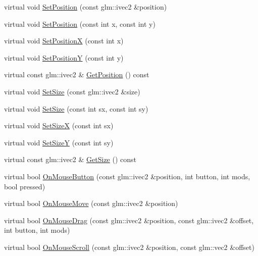 \begin{DoxyCompactItemize}
\item 
virtual void \mbox{\hyperlink{classec__gui_1_1_widget_a1d109a45aa25340f8e76e037e5309be1}{Set\+Position}} (const glm\+::ivec2 \&position)
\item 
virtual void \mbox{\hyperlink{classec__gui_1_1_widget_ac2af69d4d1b2f03310f036299c9df917}{Set\+Position}} (const int x, const int y)
\item 
virtual void \mbox{\hyperlink{classec__gui_1_1_widget_afe068fddbf6bb9fb132c829b78e29984}{Set\+PositionX}} (const int x)
\item 
virtual void \mbox{\hyperlink{classec__gui_1_1_widget_a1dfe01358a4dc69941d5141de9e66ff8}{Set\+PositionY}} (const int y)
\item 
virtual const glm\+::ivec2 \& \mbox{\hyperlink{classec__gui_1_1_widget_ace68937b0334a408312828ea94513814}{Get\+Position}} () const
\item 
virtual void \mbox{\hyperlink{classec__gui_1_1_widget_a845691425cc4e13e055b35dbb9c18d7e}{Set\+Size}} (const glm\+::ivec2 \&size)
\item 
virtual void \mbox{\hyperlink{classec__gui_1_1_widget_ade5474a970a3504eca130eb50739d34a}{Set\+Size}} (const int sx, const int sy)
\item 
virtual void \mbox{\hyperlink{classec__gui_1_1_widget_acee029f601be945a2e233e352644dc8c}{Set\+SizeX}} (const int sx)
\item 
virtual void \mbox{\hyperlink{classec__gui_1_1_widget_a91209a601e8b6fa1a5578c7c4436418e}{Set\+SizeY}} (const int sy)
\item 
virtual const glm\+::ivec2 \& \mbox{\hyperlink{classec__gui_1_1_widget_a3f13ba30cee150d52346210a970ff41e}{Get\+Size}} () const
\item 
virtual bool \mbox{\hyperlink{classec__gui_1_1_widget_a00bff8173079cc1cb69ec84910715ffb}{On\+Mouse\+Button}} (const glm\+::ivec2 \&position, int button, int mods, bool pressed)
\item 
virtual bool \mbox{\hyperlink{classec__gui_1_1_widget_a8b4943212deb1a9774d119b0b09f9078}{On\+Mouse\+Move}} (const glm\+::ivec2 \&position)
\item 
virtual bool \mbox{\hyperlink{classec__gui_1_1_widget_a1801c494e708ae6deb39386feb352f23}{On\+Mouse\+Drag}} (const glm\+::ivec2 \&position, const glm\+::ivec2 \&offset, int button, int mods)
\item 
virtual bool \mbox{\hyperlink{classec__gui_1_1_widget_a528c2b3639db65de6281fc1bb679dfcb}{On\+Mouse\+Scroll}} (const glm\+::ivec2 \&position, const glm\+::vec2 \&offset)
\item 

\end{DoxyCompactItemize}
